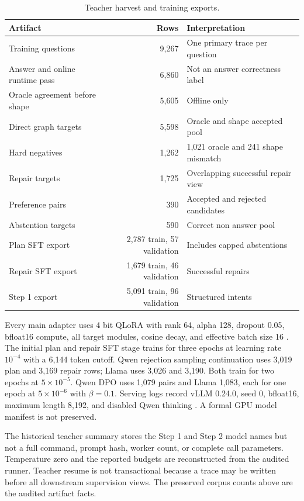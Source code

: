 \documentclass{article}
\begin{document}
\begin{table}[h]
  \centering
  \caption{Teacher harvest and training exports.}
  \label{tab:training-data}
  \small
  \begin{tabularx}{\linewidth}{XrX}
    \toprule
    Artifact & Rows & Interpretation \\
    \midrule
    Training questions & 9,267 & One primary trace per question \\
    Answer and online runtime pass & 6,860 & Not an answer correctness label \\
    Oracle agreement before shape & 5,605 & Offline only \\
    Direct graph targets & 5,598 & Oracle and shape accepted pool \\
    Hard negatives & 1,262 & 1,021 oracle and 241 shape mismatch \\
    Repair targets & 1,725 & Overlapping successful repair view \\
    Preference pairs & 390 & Accepted and rejected candidates \\
    Abstention targets & 590 & Correct non answer pool \\
    Plan SFT export & 2,787 train, 57 validation & Includes capped abstentions \\
    Repair SFT export & 1,679 train, 46 validation & Successful repairs \\
    Step 1 export & 5,091 train, 96 validation & Structured intents \\
    \bottomrule
  \end{tabularx}
\end{table}

Every main adapter uses 4 bit QLoRA with rank 64, alpha 128, dropout 0.05, bfloat16 compute, all
target modules, cosine decay, and effective batch size 16 \citep{hu2022lora,dettmers2023qlora}.
The initial plan and repair SFT stage trains for three epochs at learning rate $10^{-4}$ with a
6,144 token cutoff.  Qwen rejection sampling continuation uses 3,019 plan and 3,169 repair rows;
Llama uses 3,026 and 3,190.  Both train for two epochs at $5\times10^{-5}$.  Qwen DPO uses 1,079
pairs and Llama 1,083, each for one epoch at $5\times10^{-6}$ with $\beta=0.1$.  Serving logs record
vLLM 0.24.0, seed 0, bfloat16, maximum length 8,192, and disabled Qwen thinking
\citep{kwon2023vllm}.  A formal GPU model manifest is not preserved.

The historical teacher summary stores the Step 1 and Step 2 model names but not a full command,
prompt hash, worker count, or complete call parameters.  Temperature zero and the reported budgets
are reconstructed from the audited runner.  Teacher resume is not transactional because a trace may
be written before all downstream supervision views.  The preserved corpus counts above are the
audited artifact facts.
\end{document}
